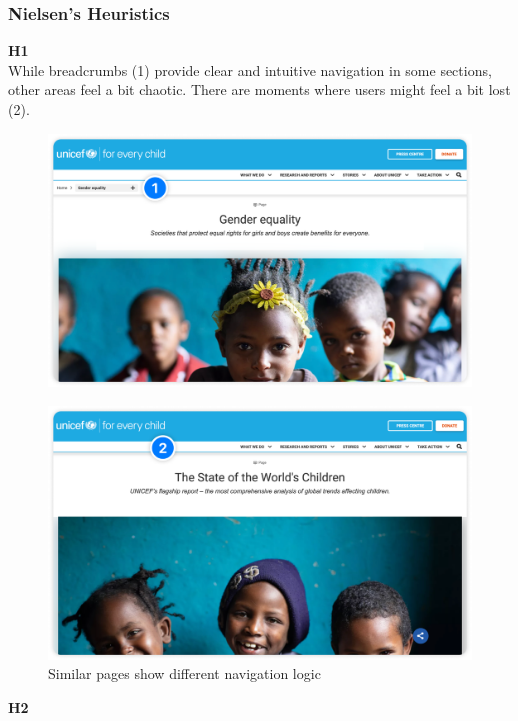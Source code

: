 \subsubsection{Nielsen's Heuristics}
\begin{description}
    \item {\textbf{H1} \color{unicefGray}{Visibility of the system status}}\\
    While breadcrumbs (1) provide clear and intuitive navigation in some sections, other areas feel a bit chaotic. 
    There are moments where users might feel a bit lost (2).
    \begin{figure}[h]
        \centering
        \includegraphics[scale=0.20]{Resources/Dario/breadcrumbs}
    \end{figure}
    \begin{figure}[h]
        \centering
        \includegraphics[scale=0.20]{Resources/Dario/nobreadcrumbs}
        \caption{Similar pages show different navigation logic}
    \end{figure}
    \item {\textbf{H2} \color{unicefGray}{Match between system and the real world}}\\

\end{description}
